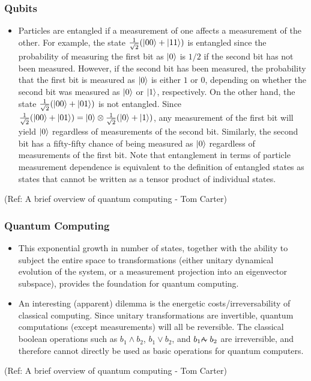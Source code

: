  \begin{frame}[fragile]\frametitle{Qubits}

\begin{itemize}
\item Particles are entangled if a measurement of one
affects a measurement of the other. For example, the state 
$\frac{1}{\sqrt{2}}(|{00}\rangle+|{11}\rangle)$ is entangled since the 
probability of measuring the first bit as $|{0}\rangle$ is $1/2$ 
if the second bit has not been measured. However, if the second bit
has been measured, the probability that the first bit is 
measured as $|{0}\rangle$ is either $1$ or $0$, depending on whether the
second bit was measured as $|{0}\rangle$ or $|{1}\rangle$, respectively. On the other hand, the state
$\frac{1}{\sqrt{2}}(|{00}\rangle+|{01}\rangle)$ is not entangled. Since 
$\frac{1}{\sqrt{2}}(|{00}\rangle+|{01}\rangle) = |{0}\rangle\otimes \frac{1}{\sqrt{2}}(|{0}\rangle+|{1}\rangle)$, any 
measurement of the first bit will yield $|{0}\rangle$ regardless of
measurements of the second bit.  Similarly, the second bit has a 
fifty-fifty chance of being measured as $|{0}\rangle$ regardless of 
measurements of the first bit. Note that entanglement in terms of particle measurement dependence is equivalent to the definition of entangled
states as states that cannot be written as a tensor product of individual
states.
\end{itemize}

\tiny{(Ref: A brief overview of quantum computing - Tom Carter)}

\end{frame}

 \begin{frame}[fragile]\frametitle{Quantum Computing}

\begin{itemize}

	\item This exponential growth in number of states, together with the ability to subject the entire space to transformations (either unitary dynamical evolution of the system, or a measurement projection into an eigenvector subspace), provides the foundation for quantum computing.
	\item An interesting (apparent) dilemma is the energetic costs/irreversability of classical computing.  Since unitary transformations are invertible, quantum computations (except measurements) will all be reversible.  The classical boolean operations such as $b_1\land b_2$, $b_1\lor b_2$, and $b_1\land\negthickspace\negthickspace\negmedspace\negthinspace\sim b_2$ are irreversible, and therefore cannot directly be used as basic operations for quantum computers.

\end{itemize}

\tiny{(Ref: A brief overview of quantum computing - Tom Carter)}

\end{frame}

